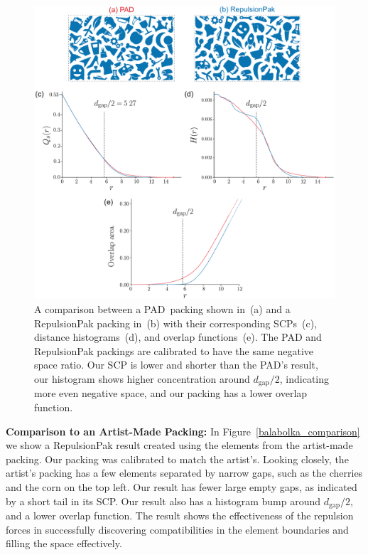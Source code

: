 \begin{figure}
\centering
\includegraphics[width=1.0\textwidth]{figures/metrics/pad_comparison_big.pdf}
\caption[A comparison between a PAD~packing and a RepulsionPak packing]
{\label{pad_comparison}
A comparison between a PAD~packing shown in~(a) and a RepulsionPak packing in~(b) 
with their corresponding SCPs~(c), distance histograms~(d), and overlap functions~(e). 
The PAD and RepulsionPak packings are calibrated
to have the same negative space ratio.
Our SCP is lower and shorter than the PAD's result,
our histogram shows higher concentration around $d_\mathrm{gap} / 2$,
indicating more even negative space,
and our packing has a lower overlap function.
}
\end{figure}


\textbf{Comparison to an Artist-Made Packing:} 
In Figure~\ref{balabolka_comparison} we show a RepulsionPak result created 
using the elements from the artist-made packing.
Our packing was calibrated to match the artist's.
Looking closely, the artist's packing has a few elements 
separated by narrow gaps, such as the cherries and the corn on the top left.
Our result has fewer large empty gaps, as indicated by a short tail
in its SCP.
Our result also has a histogram bump around $d_\mathrm{gap}/2$, and a lower overlap function.
The result shows the effectiveness of the repulsion forces in successfully
discovering compatibilities in the element boundaries and filling the space effectively.

